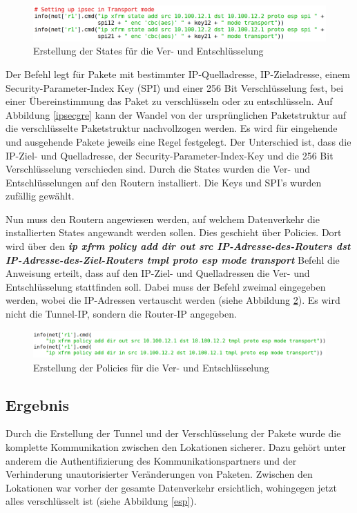 \documentclass[fontsize=12pt,paper=a4,open=any,parskip=half,
  twoside=false,toc=listof,toc=bibliography,fleqn,leqno,
  captions=nooneline,captions=tableabove,british]{scrbook}
\begin{document}
\begin{figure}[H]
 \centering
 \includegraphics[width=1.0\textwidth]{Bilder/state}
 \captionsetup{justification=centering,margin=2cm}
 \caption{Erstellung der States für die Ver- und Entschlüsselung}
 \label{state}
\end{figure}

Der Befehl legt für Pakete mit bestimmter IP-Quelladresse, IP-Zieladresse, einem Security-Parameter-Index Key (SPI) und einer 256 Bit Verschlüsselung fest, bei einer Übereinstimmung das Paket zu verschlüsseln oder zu entschlüsseln. Auf Abbildung \ref{ipsecgre} kann der Wandel von der ursprünglichen Paketstruktur auf die verschlüsselte Paketstruktur nachvollzogen werden. Es wird für eingehende und ausgehende Pakete jeweils eine Regel festgelegt. Der Unterschied ist, dass die IP-Ziel- und Quelladresse, der Security-Parameter-Index-Key und die 256 Bit Verschlüsselung verschieden sind. Durch die States wurden die Ver- und Entschlüsselungen auf den Routern installiert. Die Keys und SPI’s wurden zufällig gewählt. 

Nun muss den Routern angewiesen werden, auf welchem Datenverkehr die installierten States angewandt werden sollen. Dies geschieht über Policies. Dort wird über den \textit{\textbf{ip xfrm policy add dir out src IP-Adresse-des-Routers dst IP-Adresse-des-Ziel-Routers tmpl proto esp mode transport}} Befehl die Anweisung erteilt, dass auf den IP-Ziel- und Quelladressen die Ver- und Entschlüsselung stattfinden soll. Dabei muss der Befehl zweimal eingegeben werden, wobei die IP-Adressen vertauscht werden (siehe Abbildung \ref{policy}). Es wird nicht die Tunnel-IP, sondern die Router-IP angegeben.

\begin{figure}[H]
 \centering
 \includegraphics[width=1.0\textwidth]{Bilder/policy}
 \captionsetup{justification=centering,margin=2cm}
 \caption{Erstellung der Policies für die Ver- und Entschlüsselung}
 \label{policy}
\end{figure}

\subsection{Ergebnis}
Durch die Erstellung der Tunnel und der Verschlüsselung der Pakete wurde die komplette Kommunikation zwischen den Lokationen sicherer. Dazu gehört unter anderem die Authentifizierung des Kommunikationspartners und der Verhinderung unautorisierter Veränderungen von Paketen. Zwischen den Lokationen war vorher der gesamte Datenverkehr ersichtlich, wohingegen jetzt alles verschlüsselt ist (siehe Abbildung \ref{esp}).
\end{document}

